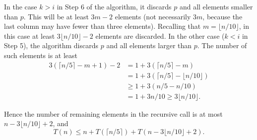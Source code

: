 In the case $k>i$ in Step 6 of the algorithm, it discards $p$ and all elements smaller than $p$.
This will be at least $3m-2$ elements (not necessarily $3m$, because the last column may have fewer than three elements).
Recalling that $m=\lfloor n/10\rfloor$,
in this case at least $3\lfloor n/10\rfloor - 2$ elements are discarded.
In the other case ($k<i$ in Step 5), the algorithm discards $p$ and all elements larger than $p$.
The number of such elements is at least
\begin{align*}
  3(\lceil n/5\rceil - m + 1) -2
  & = 1 + 3(\lceil n/5\rceil - m) \\
  & = 1+ 3(\lceil n/5\rceil - \lfloor n/10 \rfloor) \\
  & \ge 1+ 3(n/5 - n/10) \\
  & = 1+ 3 n/10 \ge 3\lfloor n/10 \rfloor.
\end{align*}

Hence the number of remaining elements in the recursive call
is at most $n-3\lfloor n/10\rfloor + 2$,
and
\[T(n) \le n + T(\lceil n/ 5\rceil) + T(n-3\lfloor n/10\rfloor + 2).\]

